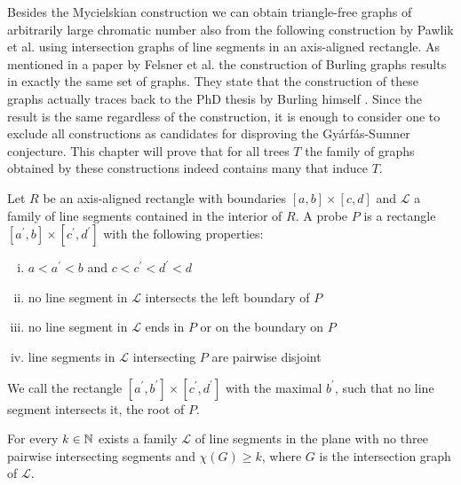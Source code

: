 Besides the Mycielskian construction we can obtain triangle-free graphs of arbitrarily large chromatic number also from the following construction by Pawlik et al. \cite{Paw14} using intersection graphs of line segments in an axis-aligned rectangle. As mentioned in a paper by Felsner et al. \cite{Fe18} the construction of Burling graphs results in exactly the same set of graphs. They state that the  construction of these graphs actually traces back to the PhD thesis by Burling himself \cite{Bu65}. Since the result is the same regardless of the construction, it is enough to consider one to exclude all constructions as candidates for disproving the Gyárfás-Sumner conjecture. This chapter will prove that for all trees $T$ the family of graphs obtained by these constructions indeed contains many that induce $T$.

\begin{defn}
Let $R$ be an axis-aligned rectangle with boundaries $[a,b]\times [c,d]$ and $\mathcal{L}$ a family of line segments contained in the interior of $R$. A probe $P$ is a rectangle $[a^\prime ,b]\times [c^\prime ,d^\prime]$ with the following properties:
\begin{enumerate}[(i)]
\item $a<a^\prime < b$ and $c<c^\prime <d^\prime < d$
\item no line segment in $\mathcal{L}$ intersects the left boundary of $P$
\item no line segment in $\mathcal{L}$ ends in $P$ or on the boundary on $P$
\item line segments in $\mathcal{L}$ intersecting $P$ are pairwise disjoint
\end{enumerate}
We call the rectangle $[a^\prime ,b^\prime ]\times [c^\prime ,d^\prime]$ with the maximal $b^\prime$, such that no line segment intersects it, the root of $P$.
\end{defn}

\begin{thm}
For every $k\in\mathbb{N}$ exists a family $\mathcal{L}$ of line segments in the plane with no three pairwise intersecting segments and $\chi (G)\geq k$, where $G$ is the intersection graph of $\mathcal{L}$.
\end{thm}

